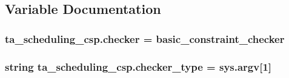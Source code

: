 \subsection{Variable Documentation}
\hypertarget{namespaceta__scheduling__csp_a98819fe7754e86a2cfb4ac62a6f5ec99}{}
\subsubsection[{checker}]{\setlength{\rightskip}{0pt plus 5cm}ta\+\_\+scheduling\+\_\+csp.\+checker = basic\+\_\+constraint\+\_\+checker}\label{namespaceta__scheduling__csp_a98819fe7754e86a2cfb4ac62a6f5ec99}
\hypertarget{namespaceta__scheduling__csp_a1def685a3059b03154523ea8c5472760}{}
\subsubsection[{checker\+\_\+type}]{\setlength{\rightskip}{0pt plus 5cm}string ta\+\_\+scheduling\+\_\+csp.\+checker\+\_\+type = sys.\+argv\mbox{[}1\mbox{]}}\label{namespaceta__scheduling__csp_a1def685a3059b03154523ea8c5472760}
